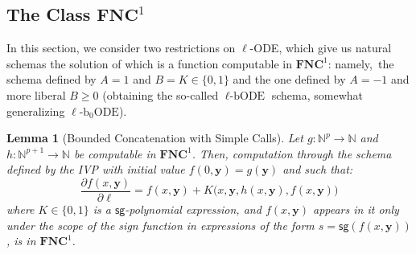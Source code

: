 \documentclass[11pt, oneside]{article}
\newcommand{\fun}[1]{\mathsf{#1}}
\newcommand{\Nat}{\mathbb{N}}
\newcommand{\NC}{\mathbf{FNC}}
\newcommand{\AC}{\mathbf{FAC}}
\newcommand{\tu}[1]{\mathbf{#1}}
\newtheorem{lemma}{Lemma}
\theoremstyle{definition}
\newcommand{\schODE}{\ell\text{-b}_0\text{ODE}}
\newcommand{\chODE}{\ell\text{-bODE}}
\begin{document}


\subsection{The Class $\NC^1$}\label{sec:chODE}
In this section, we consider two restrictions on $\ell$-ODE, which give us natural schemas the solution of which is a function computable in $\NC^1$: namely,~the schema defined by $A=1$ and $B=K\in \{0,1\}$ and the one defined by $A=-1$  and more liberal $B\ge 0$ (obtaining the so-called $\chODE$ schema, somewhat generalizing $\schODE$).


\begin{lemma}[Bounded Concatenation with Simple Calls]\label{lemma:ODENC1}
    Let $g:\Nat^p \to \Nat$ and $h: \Nat^{p+1} \to \Nat$ be computable in $\NC^1$.
    Then, computation through the schema defined by the IVP with initial value $f(0, \tu y)=g(\tu y)$ and such that:
    $$
    \frac{\partial f(x, \tu y)}{\partial \ell} = f(x, \tu y) + K\big(x, \tu y, h(x, \tu y), f(x, \tu y)\big)
    $$
    where $K\in \{0,1\}$ is a $\fun{sg}$-polynomial expression, and $f(x, \tu y)$ appears in it only under the scope of the sign function in expressions of the form $s=\fun{sg}(f(x, \tu y))$, is in $\NC^1$.
\end{lemma}
\end{document}

